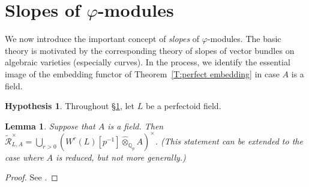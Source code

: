 \documentclass[12pt]{amsart}
\newtheorem{lemma}[theorem]{Lemma}
\theoremstyle{definition}
\newtheorem{hypothesis}[theorem]{Hypothesis}
\numberwithin{equation}{theorem}
\newcommand{\QQ}{\mathbb{Q}}
\newcommand{\calR}{\mathcal{R}}
\begin{document}
\section{Slopes of \texorpdfstring{$\varphi$}{phi}-modules}
\label{sec:slopes}

We now introduce the important concept of \emph{slopes} of $\varphi$-modules. The basic theory is motivated by the corresponding theory of slopes of vector bundles on algebraic varieties (especially curves). In the process, we identify the essential image of the embedding functor of Theorem~\ref{T:perfect embedding} in case $A$ is a field.

\begin{hypothesis}
Throughout \S\ref{sec:slopes}, let $L$ be a perfectoid field.
\end{hypothesis}

\begin{lemma} \label{L:units}
Suppose that $A$ is a field.
Then $\tilde{\calR}_{L,A}^{\times} = \bigcup_{r>0} (W^r(L)[p^{-1}] \widehat{\otimes}_{\QQ_p} A)^\times$.
(This statement can be extended to the case where $A$ is reduced, but not more generally.)
\end{lemma}
\begin{proof}
See \cite[Corollary~4.2.5]{kedlaya-liu1}.
\end{proof}
\end{document}
